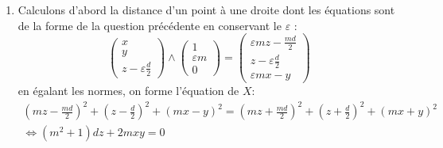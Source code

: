 \begin{enumerate}
\begin{enumerate}
\item Calculons d'abord la distance d'un point à une droite dont les équations sont de la forme de la question précédente en conservant le $\varepsilon$ :
\begin{displaymath}
 \begin{pmatrix}
  x\\y\\z-\varepsilon \frac{d}{2}
 \end{pmatrix}
\wedge
\begin{pmatrix}
 1\\ \varepsilon m \\0
\end{pmatrix}
=
\begin{pmatrix}
 \varepsilon mz -\frac{md}{2}\\ z-\varepsilon \frac{d}{2} \\ \varepsilon mx -y
\end{pmatrix}
\end{displaymath}
en égalant les normes, on forme l'équation de $X$:
\begin{multline*}
 (mz-\frac{md}{2})^2+(z-\frac{d}{2})^2+(mx-y)^2
=
(mz+\frac{md}{2})^2+(z+\frac{d}{2})^2+(mx+y)^2
\\
\Leftrightarrow
(m^2+1)dz+2mxy=0
\end{multline*}

\end{enumerate}


\end{enumerate}
